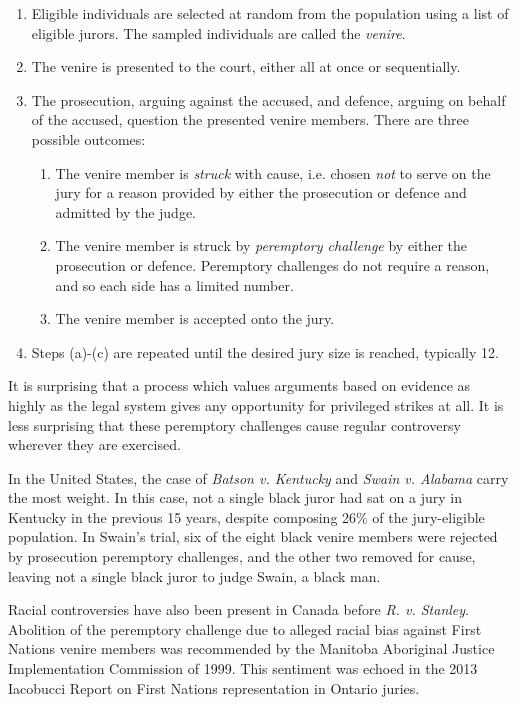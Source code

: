 \documentclass[12pt]{article}
\begin{document}
\begin{enumerate}
  \item Eligible individuals are selected at random from the population using a list of eligible jurors. The sampled individuals are called the \textit{venire}.
  \item The venire is presented to the court, either all at once or sequentially.
  \item The prosecution, arguing against the accused, and defence, arguing on behalf of the accused, question the presented venire members. There are three possible outcomes:
    \begin{enumerate}
      \item The venire member is \textit{struck} with cause, i.e. chosen \emph{not} to serve on the jury for a reason provided by either the prosecution or defence and admitted by the judge.
      \item The venire member is struck by \textit{peremptory challenge} by either the prosecution or defence. Peremptory challenges do not require a reason, and so each side has a limited number.
      \item The venire member is accepted onto the jury.
    \end{enumerate}
  \item Steps (a)-(c) are repeated until the desired jury size is reached, typically 12.
\end{enumerate}

It is surprising that a process which values arguments based on evidence as highly as the legal system gives any opportunity for privileged strikes at all. It is less surprising that these peremptory challenges cause regular controversy wherever they are exercised.

In the United States, the case of \emph{Batson v. Kentucky} and \emph{Swain v. Alabama} carry the most weight. In this case, not a single black juror had sat on a jury in Kentucky in the previous 15 years, despite composing 26\% of the jury-eligible population. In Swain's trial, six of the eight black venire members were rejected by prosecution peremptory challenges, and the other two removed for cause, leaving not a single black juror to judge Swain, a black man.

Racial controversies have also been present in Canada before \textit{R. v. Stanley}. Abolition of the peremptory challenge due to alleged racial bias against First Nations venire members was recommended by the Manitoba Aboriginal Justice Implementation Commission of 1999. This sentiment was echoed in the 2013 Iacobucci Report on First Nations representation in Ontario juries.
\end{document}
